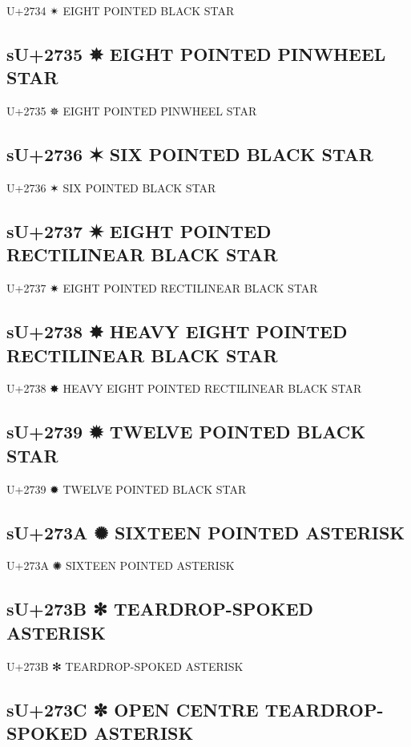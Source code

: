U+2734 ✴ EIGHT POINTED BLACK STAR

\subsection{sU+2735 ✵ EIGHT POINTED PINWHEEL STAR}

U+2735 ✵ EIGHT POINTED PINWHEEL STAR

\subsection{sU+2736 ✶ SIX POINTED BLACK STAR}

U+2736 ✶ SIX POINTED BLACK STAR

\subsection{sU+2737 ✷ EIGHT POINTED RECTILINEAR BLACK STAR}

U+2737 ✷ EIGHT POINTED RECTILINEAR BLACK STAR

\subsection{sU+2738 ✸ HEAVY EIGHT POINTED RECTILINEAR BLACK STAR}

U+2738 ✸ HEAVY EIGHT POINTED RECTILINEAR BLACK STAR

\subsection{sU+2739 ✹ TWELVE POINTED BLACK STAR}

U+2739 ✹ TWELVE POINTED BLACK STAR

\subsection{sU+273A ✺ SIXTEEN POINTED ASTERISK}

U+273A ✺ SIXTEEN POINTED ASTERISK

\subsection{sU+273B ✻ TEARDROP-SPOKED ASTERISK}

U+273B ✻ TEARDROP-SPOKED ASTERISK

\subsection{sU+273C ✼ OPEN CENTRE TEARDROP-SPOKED ASTERISK}

